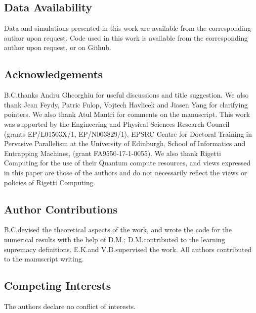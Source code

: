 \documentclass[10pt, a4paper ]{article}
\begin{document}

\maketitle



\begin{multicols}{2}







\subsection*{Data Availability}\label{sec:data_availability}
Data and simulations presented in this work are available from the corresponding author upon request. Code used in this work is available from the corresponding author upon request, or on Github\cite{briancoyle_implementation_2019}.
\subsection*{Acknowledgements}\label{sec:acknowledgements}

B.C.\@ thanks Andru Gheorghiu for useful discussions and title suggestion. We also thank Jean Feydy, Patric Fulop, Vojtech Havlicek and Jiasen Yang for clarifying pointers. We also thank Atul Mantri for comments on the manuscript. This work was supported by the Engineering and Physical Sciences Research Council (grants EP/L01503X/1, EP/N003829/1), EPSRC Centre for Doctoral Training in Pervasive Parallelism at the University of Edinburgh, School of Informatics and Entrapping Machines, (grant FA9550-17-1-0055). We also thank Rigetti Computing for the use of their Quantum compute resources, and views expressed in this paper are those of the authors and do not necessarily reflect the views or policies of Rigetti Computing.

\subsection*{Author Contributions}
B.C.\@ devised the theoretical aspects of the work, and wrote the code for the numerical results with the help of D.M.\@; D.M.\@ contributed to the learning supremacy definitions. 
E.K.\@ and V.D.\@ supervised the work. All authors contributed to the manuscript writing. 

\subsection*{Competing Interests}
The authors declare no conflict of interests.

% 


\end{multicols}
\end{document}

